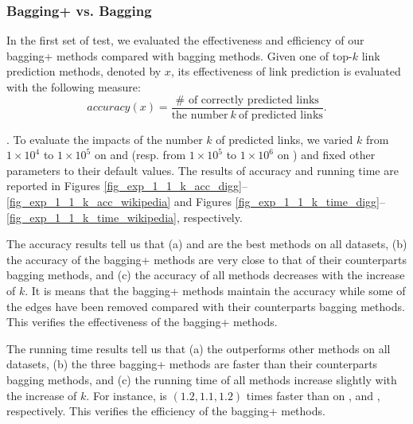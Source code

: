 \subsubsection{Bagging+ vs. Bagging}
In the first set of test, we evaluated the effectiveness and efficiency of our bagging+ methods
compared with bagging methods. Given one of top-$k$ link prediction methods, denoted by $x$, its effectiveness
of link prediction is evaluated with the following measure:
\begin{equation}
accuracy(x) = \frac{\# \textrm{ of correctly predicted links}}{\textrm{the number} \ k\ \textrm{of predicted links}}.
\end{equation}




. To evaluate the impacts of the number $k$ of
predicted links, we varied $k$ from $1\times 10^4$ to $1\times 10^5$ on \Digg
and \YouTube (resp. from $1\times 10^5$ to $1\times 10^6$ on \Wikipedia)
and fixed other parameters to their default values.
The results of accuracy and running time are reported in Figures \ref{fig_exp_1_1_k_acc_digg}--\ref{fig_exp_1_1_k_acc_wikipedia}
and Figures \ref{fig_exp_1_1_k_time_digg}--\ref{fig_exp_1_1_k_time_wikipedia}, respectively.


The accuracy results tell us that
(a) \Biased and \Biasedp are the best methods on all datasets,
(b) the accuracy of the bagging+ methods are very close to that
of their counterparts bagging methods, and (c) the accuracy of all
methods decreases with the increase of $k$. It is means that the
bagging+ methods maintain the accuracy while some of the
edges have been removed compared with their counterparts bagging methods.
This verifies the effectiveness of the bagging+ methods.


The running time results tell us that (a) the \Biasedp outperforms
other methods on all datasets, (b) the three bagging+ methods are faster
than their counterparts bagging methods, and (c) the running time of all
methods increase slightly with the increase of $k$. For instance,
\Biasedp is $(1.2, 1.1, 1.2)$ times faster than
\Biased on \Digg, \YouTube and \Wikipedia, respectively.
This verifies the efficiency of the bagging+ methods.







